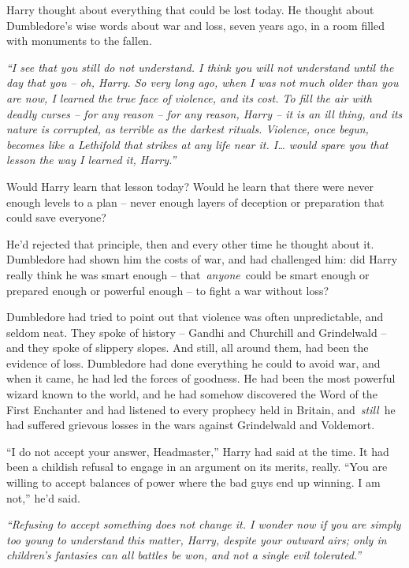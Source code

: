 Harry thought about everything that could be lost today. He thought
about Dumbledore's wise words about war and loss, seven years ago, in a
room filled with monuments to the fallen.

\emph{``I see that you still do not understand. I think you will not
understand until the day that you -- oh, Harry. So very long ago, when I
was not much older than you are now, I learned the true face of
violence, and its cost. To fill the air with deadly curses -- for any
reason -- for any reason, Harry -- it is an ill thing, and its nature is
corrupted, as terrible as the darkest rituals. Violence, once begun,
becomes like a Lethifold that strikes at any life near it. I\ldots{}
would spare you that lesson the way I learned it, Harry.''}

Would Harry learn that lesson today? Would he learn that there were
never enough levels to a plan -- never enough layers of deception or
preparation that could save everyone?

He'd rejected that principle, then and every other time he thought about
it. Dumbledore had shown him the costs of war, and had challenged him:
did Harry really think he was smart enough -- that~\emph{anyone}~could
be smart enough or prepared enough or powerful enough -- to fight a war
without loss?

Dumbledore had tried to point out that violence was often unpredictable,
and seldom neat. They spoke of history -- Gandhi and Churchill and
Grindelwald -- and they spoke of slippery slopes. And still, all around
them, had been the evidence of loss. Dumbledore had done everything he
could to avoid war, and when it came, he had led the forces of goodness.
He had been the most powerful wizard known to the world, and he had
somehow discovered the Word of the First Enchanter and had listened to
every prophecy held in Britain, and~\emph{still}~he had suffered
grievous losses in the wars against Grindelwald and Voldemort.

``I do not accept your answer, Headmaster,'' Harry had said at the time.
It had been a childish refusal to engage in an argument on its merits,
really. ``You are willing to accept balances of power where the bad guys
end up winning. I am not,'' he'd said.

\emph{``Refusing to accept something does not change it. I wonder now if
you are simply too young to understand this matter, Harry, despite your
outward airs; only in children's fantasies can all battles be won, and
not a single evil tolerated.''}

